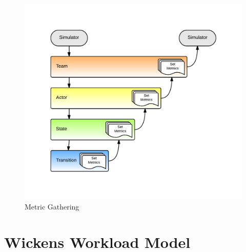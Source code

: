 \begin{figure}[h]
\begin{center}
\includegraphics[width=6in]{metric_gathering.png}
\caption{Metric Gathering}
\label{fig:metric_gathering}
\end{center}
\end{figure}

\section{Wickens Workload Model}


